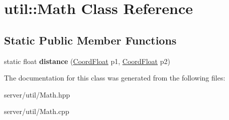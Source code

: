\hypertarget{classutil_1_1_math}{\section{util\-:\-:Math Class Reference}
\label{classutil_1_1_math}
}
\subsection*{Static Public Member Functions}
\begin{DoxyCompactItemize}
\item 
\hypertarget{classutil_1_1_math_a957aff2dd0420b4a8869b4ad33c0440b}{static float {\bfseries distance} (\hyperlink{classutil_1_1_coordinates}{Coord\-Float} p1, \hyperlink{classutil_1_1_coordinates}{Coord\-Float} p2)}\label{classutil_1_1_math_a957aff2dd0420b4a8869b4ad33c0440b}

\end{DoxyCompactItemize}


The documentation for this class was generated from the following files\-:\begin{DoxyCompactItemize}
\item 
server/util/Math.\-hpp\item 
server/util/Math.\-cpp\end{DoxyCompactItemize}
